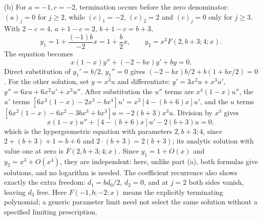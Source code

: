 (b) For $a=-1,c=-2$, termination occurs before the zero denominator:
$(a)_j=0$ for $j\ge2$, while $(c)_1=-2$, $(c)_2=2$ and $(c)_j=0$
only for $j\ge3$.  With $2-c=4$, $a+1-c=2$, $b+1-c=b+3$,
\[
y_1=1+\frac{(-1)b}{-2}x=1+\frac b2x,
\qquad
 y_2=x^3F(2,b+3;4;x).
\]
The equation becomes
\[
x(1-x)y''+(-2-bx)y'+by=0.
\]
Direct substitution of $y_1'=b/2$, $y_1''=0$ gives
$(-2-bx)b/2+b(1+bx/2)=0$.
For the other solution, set $y=x^3u$ and differentiate:
$y'=3x^2u+x^3u'$, $y''=6xu+6x^2u'+x^3u''$.
After substitution the $u''$ terms are $x^4(1-x)u''$, the $u'$ terms
$[6x^3(1-x)-2x^3-bx^4]u'=x^3[4-(b+6)x]u'$, and the $u$ terms
$[6x^2(1-x)-6x^2-3bx^3+bx^3]u=-2(b+3)x^3u$.
Division by $x^3$ gives
\[
x(1-x)u''+[4-(b+6)x]u'-2(b+3)u=0,
\]
which is the hypergeometric equation with parameters $2,b+3;4$,
since $2+(b+3)+1=b+6$ and $2\cdot(b+3)=2(b+3)$; its analytic
solution with value one at zero is $F(2,b+3;4;x)$.
Since $y_1=1+O(x)$ and $y_2=x^3+O(x^4)$, they are independent:
here, unlike part (a), both formulas give solutions, and no
logarithm is needed.
The coefficient recurrence also shows exactly the extra freedom:
$d_1=b d_0/2$, $d_2=0$, and at $j=2$ both sides vanish, leaving
$d_3$ free.  Here $F(-1,b;-2;x)$ means the explicitly terminating
polynomial; a generic parameter limit need not select the same
solution without a specified limiting prescription.

